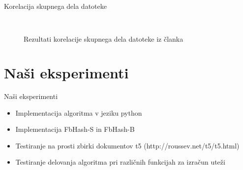 \documentclass[xcolor=dvipsnames,compress]{beamer}
\begin{document}
\begin{frame}{Korelacija skupnega dela datoteke}
   \begin{figure}[ht!]
        \label{fig:subfigures}
        \begin{center}
            \\%
        \end{center}
       \caption{Rezultati korelacije skupnega dela datoteke iz članka}
    \end{figure}
\end{frame}

\section{Naši eksperimenti}
\label{sec:eksmi}
\begin{frame}{Naši eksperimenti}
    \begin{itemize}
        \item Implementacija algoritma v jeziku python
        \item Implementacija FbHash-S in FbHash-B
        \item Testiranje na prosti zbirki dokumentov t5 (http://roussev.net/t5/t5.html)
        \item Testiranje delovanja algoritma pri različnih funkcijah za izračun uteži
    \end{itemize}
    \end{frame}
    
\end{document}
